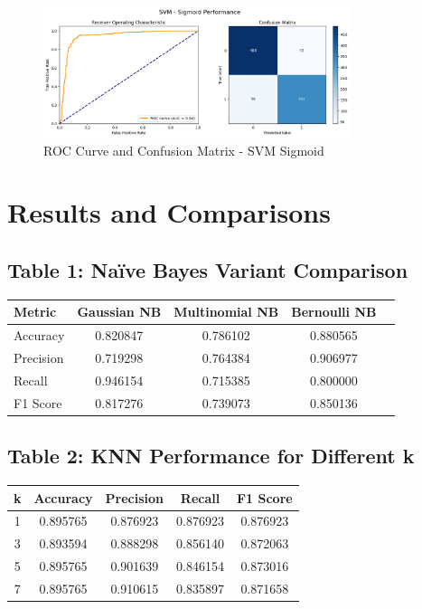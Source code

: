 \documentclass[12pt]{article}
\begin{document}
\begin{figure}[h!]
\centering
\includegraphics[width=0.8\textwidth]{images/svm4.png}
\caption{ROC Curve and Confusion Matrix - SVM Sigmoid }
\end{figure}


\clearpage

\section*{Results and Comparisons}

\subsection*{Table 1: Naïve Bayes Variant Comparison}
\begin{tabular}{|l|c|c|c|c|}
\hline
\textbf{Metric} & \textbf{Gaussian NB} & \textbf{Multinomial NB} & \textbf{Bernoulli NB} \\
\hline
Accuracy & 0.820847 & 0.786102 & 0.880565 \\
Precision & 0.719298 & 0.764384 & 0.906977 \\
Recall & 0.946154 & 0.715385 & 0.800000 \\
F1 Score & 0.817276 & 0.739073 & 0.850136 \\
\hline
\end{tabular}

\vspace{1em}

\subsection*{Table 2: KNN Performance for Different k}
\begin{tabular}{|c|c|c|c|c|}
\hline
\textbf{k} & \textbf{Accuracy} & \textbf{Precision} & \textbf{Recall} & \textbf{F1 Score} \\
\hline
1 & 0.895765 & 0.876923 & 0.876923 & 0.876923 \\
3 & 0.893594 & 0.888298 & 0.856140 & 0.872063 \\
5 & 0.895765 & 0.901639 & 0.846154 & 0.873016 \\
7 & 0.895765 & 0.910615 & 0.835897 & 0.871658 \\
\hline
\end{tabular}
\end{document}
